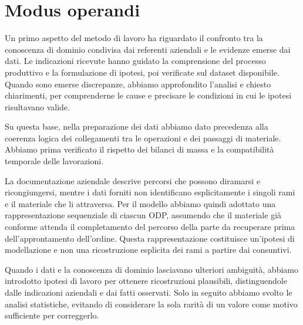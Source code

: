 \section{Modus operandi}
\label{sec:modus-operandi}

Un primo aspetto del metodo di lavoro ha riguardato il confronto tra la conoscenza di dominio condivisa dai referenti aziendali e le evidenze emerse dai dati. Le indicazioni ricevute hanno guidato la comprensione del processo produttivo e la formulazione di ipotesi, poi verificate sul dataset disponibile. Quando sono emerse discrepanze, abbiamo approfondito l'analisi e chiesto chiarimenti, per comprenderne le cause e precisare le condizioni in cui le ipotesi risultavano valide.

Su questa base, nella preparazione dei dati abbiamo dato precedenza alla coerenza logica dei collegamenti tra le operazioni e dei passaggi di materiale. Abbiamo prima verificato il rispetto dei bilanci di massa e la compatibilità temporale delle lavorazioni.

La documentazione aziendale descrive percorsi che possono diramarsi e ricongiungersi, mentre i dati forniti non identificano esplicitamente i singoli rami e il materiale che li attraversa. Per il modello abbiamo quindi adottato una rappresentazione sequenziale di ciascun ODP, assumendo che il materiale già conforme attenda il completamento del percorso della parte da recuperare prima dell'approntamento dell'ordine. Questa rappresentazione costituisce un'ipotesi di modellazione e non una ricostruzione esplicita dei rami a partire dai consuntivi.

Quando i dati e la conoscenza di dominio lasciavano ulteriori ambiguità, abbiamo introdotto ipotesi di lavoro per ottenere ricostruzioni plausibili, distinguendole dalle indicazioni aziendali e dai fatti osservati. Solo in seguito abbiamo svolto le analisi statistiche, evitando di considerare la sola rarità di un valore come motivo sufficiente per correggerlo.

